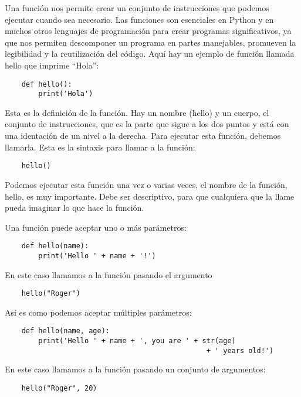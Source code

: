 \documentclass[12pt]{article}
\theoremstyle{definition}
\begin{document}
    Una función nos permite crear un conjunto de instrucciones que podemos ejecutar cuando sea necesario.
    Las funciones son esenciales en Python y en muchos otros lenguajes de programación para crear programas
    significativos, ya que nos permiten descomponer un programa en partes manejables, promueven la legibilidad y la
    reutilización del código.
    Aquí hay un ejemplo de función llamada hello que imprime ``Hola'':

    \begin{lstlisting}
    def hello():
        print('Hola')
    \end{lstlisting}

    Esta es la definición de la función.
    Hay un nombre (hello) y un cuerpo, el conjunto de instrucciones, que es la parte que sigue a los dos puntos y está
    con una identación de un nivel a la derecha.
    Para ejecutar esta función, debemos llamarla.
    Esta es la sintaxis para llamar a la función:

    \begin{lstlisting}
    hello()
    \end{lstlisting}

    Podemos ejecutar esta función una vez o varias veces, el nombre de la función, hello, es muy importante.
    Debe ser descriptivo, para que cualquiera que la llame pueda imaginar lo que hace la función.

    Una función puede aceptar uno o más parámetros:

    \begin{lstlisting}
    def hello(name):
        print('Hello ' + name + '!')
    \end{lstlisting}

    En este caso llamamos a la función pasando el argumento

    \begin{lstlisting}
    hello("Roger")
    \end{lstlisting}

    Así es como podemos aceptar múltiples parámetros:

    \begin{lstlisting}
    def hello(name, age):
        print('Hello ' + name + ', you are ' + str(age)
                                                + ' years old!')
    \end{lstlisting}

    En este caso llamamos a la función pasando un conjunto de argumentos:
    \begin{lstlisting}
    hello("Roger", 20)
    \end{lstlisting}
\end{document}
